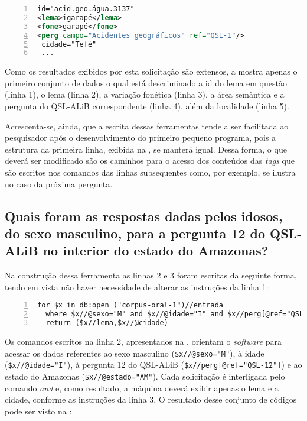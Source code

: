 \documentclass[portuguese]{textolivre}
\begin{document}
\begin{lstlisting}[language=XML, label=tab05, caption={Resultados das instruções escritas na \Cref{tab04}}, source={Elaboração do autor.}, numbers=left]
 id="acid.geo.água.3137"
<lema>igarapé</lema>
<fone>garapé</fone>
<perg campo="Acidentes geográficos" ref="QSL-1"/>
 cidade="Tefé"
 ...
\end{lstlisting} %

Como os resultados exibidos por esta solicitação são extensos, a  mostra apenas o primeiro conjunto de dados o qual está descriminado a id do lema em questão (linha 1), o lema (linha 2), a variação fonética (linha 3), a área semântica e a pergunta do QSL-ALiB correspondente (linha 4), além da localidade (linha 5). 

Acrescenta-se, ainda, que a escrita dessas ferramentas tende a ser facilitada ao pesquisador após o desenvolvimento do primeiro pequeno programa, pois a estrutura da primeira linha, exibida na , se manterá igual. Dessa forma, o que deverá ser modificado são os caminhos para o acesso dos conteúdos das \emph{tags} que são escritos nos comandos das linhas subsequentes como, por exemplo, se ilustra no caso da próxima pergunta.


\subsection{Quais foram as respostas dadas pelos idosos, do sexo masculino, para a pergunta 12 do QSL-ALiB no interior do estado do Amazonas?}

Na construção dessa ferramenta as linhas 2 e 3 foram escritas da seguinte forma, tendo em vista não haver necessidade de alterar as instruções da linha 1:

\begin{lstlisting}[language=XQuery, label=tab06, caption={Instruções para a recuperação de dados filtrados pelas variantes \emph{idade, sexo, pergunta} e \emph{localidade.}}, source={Elaboração do autor.}, numbers=left]
for $x in db:open ("corpus-oral-1")//entrada
  where $x//@sexo="M" and $x//@idade="I" and $x//perg[@ref="QSL-12"] and $x//@estado="AM"
  return ($x//lema,$x//@cidade)
\end{lstlisting} %

Os comandos escritos na linha 2, apresentados na , orientam o \emph{software} para acessar os dados referentes ao sexo masculino (\lstinline[language=XML]!$x//@sexo="M"!), à idade (\lstinline[language=XML]!$x//@idade="I"!), à pergunta 12 do QSL-ALiB (\lstinline[language=XML]!$x//perg[@ref="QSL-12"]!) e ao estado do Amazonas (\lstinline[language=XML]!$x//@estado="AM"!). Cada solicitação é interligada pelo comando \emph{and} e, como resultado, a máquina deverá exibir apenas o lema e a cidade, conforme as instruções da linha 3. O resultado desse conjunto de códigos pode ser visto na :
\end{document}
